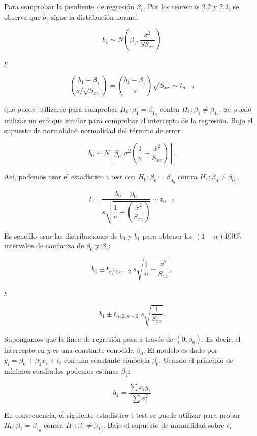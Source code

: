Para comprobar la pendiente de regresión $\beta_1$. Por los teoremas 2.2 y 2.3, se observa que $b_1$ sigue la distribución normal

$$b_1\sim N\left(\beta_1,\dfrac{\sigma^2}{SS_{xx}}\right)$$

y

\begin{tcolorbox}
    $$\left(\dfrac{b_1-\beta_1}{s/\sqrt{S_{xx}}}\right)=\left(\dfrac{b_1-\beta_1}{s}\right)\sqrt{S_{xx}}\sim t_{n-2}$$
\end{tcolorbox}

que puede utilizarse para comprobar $H_0:\beta_1=\beta_{1_0}$ contra $H_1:\beta_1\neq\beta_{1_0}$. Se puede utilizar un enfoque similar para comprobar el intercepto de la regresión. Bajo el supuesto de normalidad normalidad del término de error

$$b_0\sim N\left[\beta_0,\sigma^2\left(\dfrac{1}{n}+\dfrac{\overline{x}^2}{S_{xx}}\right)\right].$$

Así, podemos usar el estadístico  t test con $H_0:\beta_0=\beta_{0_0}$ contra $H_1:\beta_0\neq\beta_{0_0}$.

\begin{tcolorbox}
    $$t=\dfrac{b_0-\beta_0}{s\sqrt{\dfrac{1}{n}+\left(\dfrac{\overline{x}^2}{S_{xx}}\right)}}\sim t_{n-2}$$
\end{tcolorbox}

Es sencillo usar las distribuciones de $b_0$ y $b_1$ para obtener los $(1 - \alpha)100\%$ intervalos de confianza de $\beta_0$ y $\beta_1$:

\begin{tcolorbox}
    $$b_0\pm t_{\alpha/2,n-2}\; s\sqrt{\dfrac{1}{n}+\dfrac{\overline{x}^2}{S_{xx}}},$$
\end{tcolorbox}

y 

\begin{tcolorbox}
    $$b_1\pm t_{\alpha/2,n-2}\; s\sqrt{\dfrac{1}{S_{xx}}}.$$
\end{tcolorbox}

Supongamos que la linea de regresión pasa a través de $(0,\beta_0)$. Es decir, el intercepto en $y$ es una constante conocida $\beta_0$. El modelo es dado por $y_i=\beta_0+\beta_1x_i+\epsilon_i$ con una constante conocida $\beta_0$. Usando el principio de mínimos cuadrados podemos estimar $\beta_1$:

$$b_1=\dfrac{\displaystyle\sum x_iy_i}{\displaystyle\sum x_i^2}$$

En consecuencia, el siguiente estadístico t test se puede utilizar para probar $H_0: \beta_1=\beta_{1_0}$ contra $H_1:\beta_1\neq \beta_{1_0}$. Bajo el supuesto de normalidad sobre $\epsilon_i$


